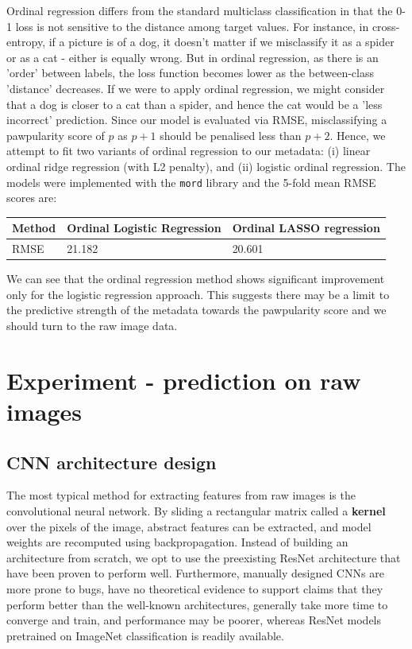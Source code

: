 \documentclass[12pt]{article}
\begin{document}
Ordinal regression differs from the standard multiclass classification in that the 0-1 loss is not sensitive to the distance among target values. For instance, in cross-entropy, if a picture is of a dog, it doesn't matter if we misclassify it as a spider or as a cat - either is equally wrong. But in ordinal regression, as there is an 'order' between labels, the loss function becomes lower as the between-class 'distance' decreases. If we were to apply ordinal regression, we might consider that a dog is closer to a cat than a spider, and hence the cat would be a 'less incorrect' prediction. Since our model is evaluated via RMSE, misclassifying a pawpularity score of $p$ as $p+1$ should be penalised less than $p+2$. Hence, we attempt to fit two variants of ordinal regression to our metadata: (i) linear ordinal ridge regression (with L2 penalty), and (ii) logistic ordinal regression. The models were implemented with the \texttt{mord} library and the 5-fold mean RMSE scores are:\newline

\begin{center}
\begin{tabular}{ | m{1.2cm} | m{5cm}| m{6cm} | } 
  \hline
  Method & Ordinal Logistic Regression & Ordinal LASSO regression \\ 
  \hline
  RMSE & 21.182 & 20.601 \\ 
  \hline
\end{tabular}
\end{center}

We can see that the ordinal regression method shows significant improvement only for the logistic regression approach. This suggests there may be a limit to the predictive strength of the metadata towards the pawpularity score and we should turn to the raw image data.

\section{Experiment - prediction on raw images}

\subsection{CNN architecture design}

The most typical method for extracting features from raw images is the convolutional neural network. By sliding a rectangular matrix called a \textbf{kernel} over the pixels of the image, abstract features can be extracted, and model weights are recomputed using backpropagation. Instead of building an architecture from scratch, we opt to use the preexisting ResNet architecture that have been proven to perform well. Furthermore, manually designed CNNs are more prone to bugs, have no theoretical evidence to support claims that they perform better than the well-known architectures, generally take more time to converge and train, and performance may be poorer, whereas ResNet models pretrained on ImageNet classification is readily available.\newline
\end{document}
